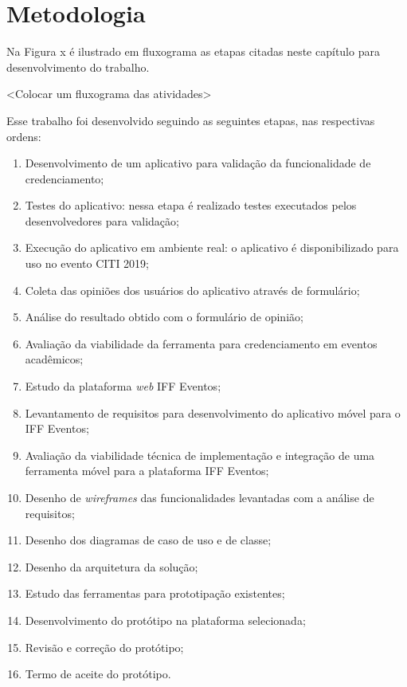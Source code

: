 \chapter{Metodologia}

Na Figura x é ilustrado em fluxograma as etapas citadas neste capítulo para desenvolvimento do trabalho.

<Colocar um fluxograma das atividades>

Esse trabalho foi desenvolvido seguindo as seguintes etapas, nas respectivas ordens: 

\begin{enumerate}
  \item Desenvolvimento de um aplicativo para validação da funcionalidade de credenciamento;
  \item Testes do aplicativo: nessa etapa é realizado testes executados pelos desenvolvedores para validação;
  \item Execução do aplicativo em ambiente real: o aplicativo é disponibilizado para uso no evento CITI 2019;
  \item Coleta das opiniões dos usuários do aplicativo através de formulário;
  \item Análise do resultado obtido com o formulário de opinião;
  \item Avaliação da viabilidade da ferramenta para credenciamento em eventos acadêmicos;
  \item Estudo da plataforma \textit{web} IFF Eventos;
  \item Levantamento de requisitos para desenvolvimento do aplicativo móvel para o IFF Eventos;
  \item Avaliação da viabilidade técnica de implementação e integração de uma ferramenta móvel para a plataforma IFF Eventos;
  \item Desenho de \textit{wireframes} das funcionalidades levantadas com a análise de requisitos;
  \item Desenho dos diagramas de caso de uso e de classe;
  \item Desenho da arquitetura da solução;
  \item Estudo das ferramentas para prototipação existentes;
  \item Desenvolvimento do protótipo na plataforma selecionada;
  \item Revisão e correção do protótipo;
  \item Termo de aceite do protótipo.
\end{enumerate}
